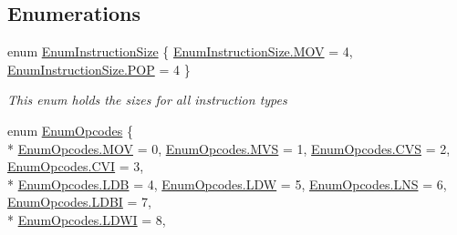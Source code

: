 \subsection*{Enumerations}
\begin{DoxyCompactItemize}
\item 
enum \hyperlink{namespace_c_p_u___o_s___simulator_1_1_c_p_u_af322082b9b46482202165fb547c052a7}{Enum\+Instruction\+Size} \{ \hyperlink{namespace_c_p_u___o_s___simulator_1_1_c_p_u_af322082b9b46482202165fb547c052a7a17b32100aef1fc19670be7fd58bc85df}{Enum\+Instruction\+Size.\+M\+O\+V} = 4, 
\hyperlink{namespace_c_p_u___o_s___simulator_1_1_c_p_u_af322082b9b46482202165fb547c052a7aefdb39a4c7286afcecf0e8a7435fce6a}{Enum\+Instruction\+Size.\+P\+O\+P} = 4
 \}\begin{DoxyCompactList}\small\item\em This enum holds the sizes for all instruction types \end{DoxyCompactList}
\item 
enum \hyperlink{namespace_c_p_u___o_s___simulator_1_1_c_p_u_ac29c87bff87ad404c953b2581024043e}{Enum\+Opcodes} \{ \\*
\hyperlink{namespace_c_p_u___o_s___simulator_1_1_c_p_u_ac29c87bff87ad404c953b2581024043ea17b32100aef1fc19670be7fd58bc85df}{Enum\+Opcodes.\+M\+O\+V} = 0, 
\hyperlink{namespace_c_p_u___o_s___simulator_1_1_c_p_u_ac29c87bff87ad404c953b2581024043ea69ad7d37a807081169292099cdec3d83}{Enum\+Opcodes.\+M\+V\+S} = 1, 
\hyperlink{namespace_c_p_u___o_s___simulator_1_1_c_p_u_ac29c87bff87ad404c953b2581024043ea51332b8fec73c1f1aeb5259d61fabb3a}{Enum\+Opcodes.\+C\+V\+S} = 2, 
\hyperlink{namespace_c_p_u___o_s___simulator_1_1_c_p_u_ac29c87bff87ad404c953b2581024043ead66368fbbeff252bb773b5b0837371b6}{Enum\+Opcodes.\+C\+V\+I} = 3, 
\\*
\hyperlink{namespace_c_p_u___o_s___simulator_1_1_c_p_u_ac29c87bff87ad404c953b2581024043ea9630d206d80399f359e9ba03ce049143}{Enum\+Opcodes.\+L\+D\+B} = 4, 
\hyperlink{namespace_c_p_u___o_s___simulator_1_1_c_p_u_ac29c87bff87ad404c953b2581024043eac3403948896175c390e1c6cf55d56e00}{Enum\+Opcodes.\+L\+D\+W} = 5, 
\hyperlink{namespace_c_p_u___o_s___simulator_1_1_c_p_u_ac29c87bff87ad404c953b2581024043eaa44cb7d46990322950d0f4b7369de7fa}{Enum\+Opcodes.\+L\+N\+S} = 6, 
\hyperlink{namespace_c_p_u___o_s___simulator_1_1_c_p_u_ac29c87bff87ad404c953b2581024043ea8d7bae8c9bed76910d021d8afe706299}{Enum\+Opcodes.\+L\+D\+B\+I} = 7, 
\\*
\hyperlink{namespace_c_p_u___o_s___simulator_1_1_c_p_u_ac29c87bff87ad404c953b2581024043ea57875effeaa72131469525bd0dc194b4}{Enum\+Opcodes.\+L\+D\+W\+I} = 8, 

\end{DoxyCompactItemize}
